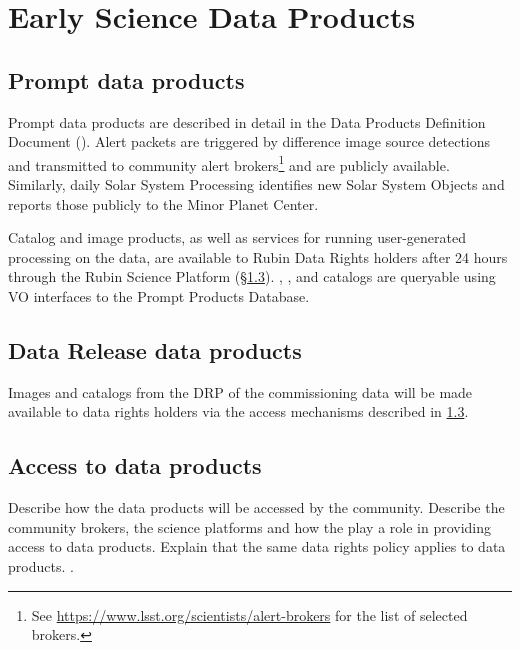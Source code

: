 \section{Early Science Data Products} 
\label{sec:data}

\subsection{Prompt data products}

Prompt data products are described in detail in the Data Products Definition Document (\DPDD).
Alert packets are triggered by difference image source detections and transmitted to community alert brokers\footnote{See \url{https://www.lsst.org/scientists/alert-brokers} for the list of selected brokers.} and are publicly available. 
Similarly, daily Solar System Processing identifies new Solar System Objects and reports those publicly to the Minor Planet Center.

Catalog and image products, as well as services for running user-generated processing on the data, are available to Rubin Data Rights holders after 24 hours through the Rubin Science Platform (\S \ref{ssec:dataaccess}).
\DIASource, \DIAObject, and \SSObject catalogs are queryable using VO interfaces to the Prompt Products Database.


\subsection{Data Release data products}
Images and catalogs from the DRP of the commissioning data will be made available to  data rights holders via the access mechanisms described in \ref{ssec:dataaccess}.

\subsection{Access to \es data products}\label{ssec:dataaccess}
Describe how the \es  data products will be accessed by the community. 
Describe the community brokers, the science platforms and how the \dpvs play a role in providing access to \es data products. 
Explain that the same data rights policy applies to \es data products. \cite{RDO-013}.


